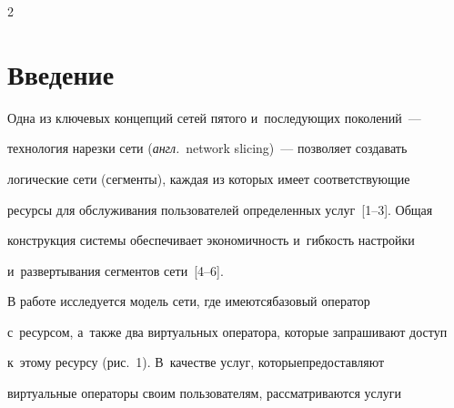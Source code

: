 

  















\thispagestyle{headings}





\begin{multicols}{2}





\label{st\stat}


  


  \section{Введение}


  


  Одна из ключевых концепций сетей пятого и~последующих поколений~--- 


технология нарезки сети (\textit{англ.}\ network slicing)~--- позволяет создавать 


логические сети (сегменты), каждая из которых имеет соответствующие 


ресурсы для обслуживания пользователей определенных услуг~[1--3]. Общая 


конструкция системы обеспечивает экономичность и~гибкость настройки 


и~развертывания сегментов сети~[4--6]. 


  


  В работе исследуется модель сети, где имеются\linebreak базовый оператор 


с~ресурсом, а~также два виртуальных оператора, которые запрашивают доступ 


к~этому ресурсу (рис.~1). В~качестве услуг, которые\linebreak предоставляют 


виртуальные операторы своим пользователям, рассматриваются услуги 



\end{multicols}
